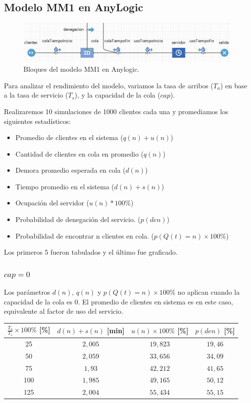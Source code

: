 \subsection{Modelo MM1 en AnyLogic}

\begin{figure}[H]
  \includegraphics[width=\linewidth]{images/anylogic-colas-modelo}
  \caption{Bloques del modelo MM1 en Anylogic.}
\end{figure}

Para analizar el rendimiento del modelo, variamos la tasa de arribos ($T_a$) en base a la tasa de servicio ($T_s$), y
la capacidad de la cola ($cap$).

Realizaremos 10 simulaciones de 1000 clientes cada una y promediamos los siguientes estadísticos:
\begin{itemize}
    \item Promedio de clientes en el sistema ($q(n)+u(n)$)
    \item Cantidad de clientes en cola en promedio ($q(n)$)
    \item Demora promedio esperada en cola ($d(n)$)
    \item Tiempo promedio en el sistema ($d(n)+s(n)$)
    \item Ocupación del servidor ($u(n)*100\%$)
    \item Probabilidad de denegación del servicio. ($p(den)$)
    \item Probabilidad de encontrar n clientes en cola. ($p(Q(t)=n)\times100\%$)
\end{itemize}

Los primeros 5 fueron tabulados y el último fue graficado.

\subsubsection[cap = 0]{$cap = 0$}

Los parámetros $d(n)$, $q(n)$ y $p(Q(t)=n)\times100\%$ no aplican cuando la capacidad de la cola es 0.
El promedio de clientes en sistema es en este caso, equivalente al factor de uso del servicio.

\begin{tabular}{||c||c|c|c||}
    \hline \hline
    $\frac{T_a}{T_s}\times100\%$ [\%] & $d(n)+s(n)$ [min] & $u(n)\times100\%$ [\%] & $p(den)$ [\%] \\
    \hline \hline
    25 & $2,005$ & $19,823$ & $19,46$ \\
    \hline
    50 & $2,059$ & $33,656$ & $34,09$ \\
    \hline
    75 & $1,93$ & $42,212$ & $41,65$ \\
    \hline
    100 & $1,985$ & $49,165$ & $50,12$ \\
    \hline
    125 & $2,004$ & $55,434$ & $55,15$ \\
    \hline \hline
\end{tabular}

